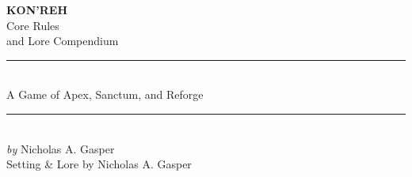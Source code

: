 \documentclass[11pt]{article}
\begin{document}
\color{ink}

\begin{titlepage}
  \thispagestyle{empty}
  \begin{center}
    \vspace*{1.5cm}

    {\Huge \bfseries KON'REH}\\[8pt]
    {\Large Core Rules}\\[2pt]
    {\large and Lore Compendium}\\[20pt]

    \rule{0.6\linewidth}{0.6pt}\\[10pt]
    {\large A Game of Apex, Sanctum, and Reforge}\\
    \rule{0.6\linewidth}{0.6pt}\\[22pt]

    {\Large \textit{by} Nicholas A. Gasper}\\[4pt]
    {\normalsize Setting \& Lore by Nicholas A. Gasper}\\[16pt]


\end{center}
\end{titlepage}

\tableofcontents
\clearpage

\clearpage
\thispagestyle{empty}
\vspace*{2cm}
\end{document}
